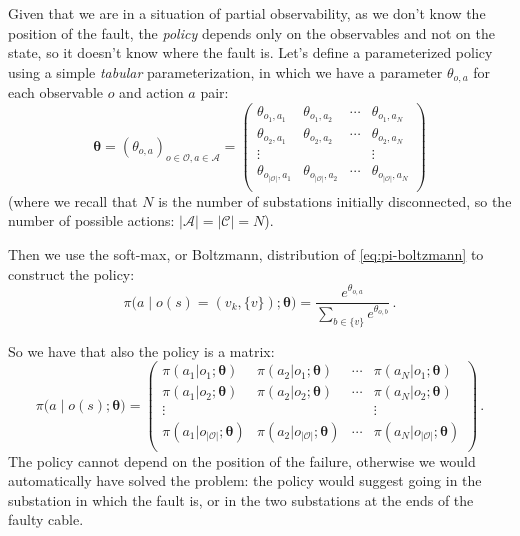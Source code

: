 Given that we are in a situation of partial observability, as we don't know the position of the fault, the \emph{policy} depends only on the observables and not on the state, so it doesn't know where the fault is. Let's define a parameterized policy using a simple \emph{tabular} parameterization, in which we have a parameter $\theta_{o,a}$ for each observable $o$ and action $a$ pair:
\begin{equation}
    \boldsymbol \theta = (\theta_{o,a})_{o \in \mathcal O, a \in \mathcal A} = \begin{pmatrix}
        \theta_{o_1, a_1} & \theta_{o_1, a_2} & \cdots & \theta_{o_1, a_N} \\
        \theta_{o_2, a_1} & \theta_{o_2, a_2} & \cdots & \theta_{o_2, a_N} \\
        \vdots            &                   &        & \vdots            \\
        \theta_{o_{|\mathcal O|}, a_1} & \theta_{o_{|\mathcal O|}, a_2}  & \cdots &  \theta_{o_{|\mathcal O|}, a_N} \\
    \end{pmatrix}
\end{equation}
(where we recall that $N$ is the number of substations initially disconnected, so the number of possible actions: $|\mathcal A| = |\mathcal C| = N$).

Then we use the soft-max, or Boltzmann, distribution of \eqref{eq:pi-boltzmann} to construct the policy:
\begin{equation}
    \pi \Big( a \;\big|\; o(s) = (v_k, \{v\}); \boldsymbol \theta \Big) = \frac{e^{\theta_{o,a} }}{\sum_{b \in \{v\}} e^{\theta_{o,b} }} \,.
    \label{eq:parameterizedpolicy}
\end{equation}

So we have that also the policy is a matrix:
\begin{equation}
    \pi \Big( a \;\big|\; o(s); \boldsymbol \theta \Big) = \begin{pmatrix}
        \pi(a_1 | o_1; \boldsymbol \theta) & \pi(a_2 | o_1; \boldsymbol \theta) & \cdots & \pi(a_N | o_1; \boldsymbol \theta) \\
        \pi(a_1 | o_2; \boldsymbol \theta) & \pi(a_2 | o_2; \boldsymbol \theta) & \cdots & \pi(a_N | o_2; \boldsymbol \theta) \\
        \vdots            &                   &        & \vdots            \\
        \pi(a_1 | o_{|\mathcal O|}; \boldsymbol \theta) & \pi(a_2 | o_{|\mathcal O|}; \boldsymbol \theta)  & \cdots &  \pi(a_N | o_{|\mathcal O|}; \boldsymbol \theta) \\
    \end{pmatrix} \, .
\end{equation}
The policy cannot depend on the position of the failure, otherwise we would automatically have solved the problem: the policy would suggest going in the substation in which the fault is, or in the two substations at the ends of the faulty cable.

